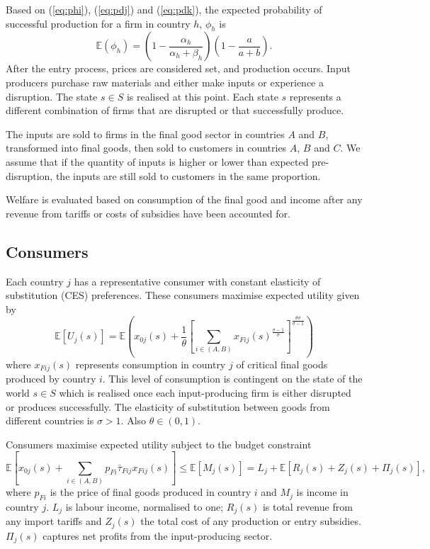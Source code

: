 \documentclass{article}
\begin{document}
Based on (\ref{eq:phi}), (\ref{eq:pdj}) and (\ref{eq:pdk}), the expected probability of successful production for a firm in country $h$, $\phi_h$ is
\begin{equation}\label{eq:ephi}
    \mathbb{E} (\phi_h) = \left(1 - \frac{\alpha_h}{\alpha_h + \beta_h}\right) \left(1 - \frac{a}{a + b}\right).
\end{equation}
After the entry process, prices are considered set, and production occurs. Input producers purchase raw materials and either make inputs or experience a disruption. The state $s \in S$ is realised at this point. Each state $s$ represents a different combination of firms that are disrupted or that successfully produce.

The inputs are sold to firms in the final good sector in countries $A$ and $B$, transformed into final goods, then sold to customers in countries $A$, $B$ and $C$. We assume that if the quantity of inputs is higher or lower than expected pre-disruption, the inputs are still sold to customers in the same proportion. 

Welfare is evaluated based on consumption of the final good and income after any revenue from tariffs or costs of subsidies have been accounted for.

\subsection{Consumers}
 
Each country $j$ has a representative consumer with constant elasticity of substitution (CES) preferences. These consumers maximise expected utility given by
\begin{equation} \label{eq:utility}
    \mathbb{E}[U_j(s)] = \mathbb{E} \left( x_{0j}(s) + \frac{1}{\theta} \left[ \sum_{i \in (A, B)} x_{Fij}(s)^{\frac{\sigma - 1}{\sigma}} \right]^{\frac{\theta \sigma}{\sigma - 1}} \right)
\end{equation}
where $x_{Fij}(s)$ represents consumption in country $j$ of critical final goods produced by country $i$. This level of consumption is contingent on the state of the world $s \in S$ which is realised once each input-producing firm is either disrupted or produces successfully. The elasticity of substitution between goods from different countries is $\sigma > 1$. Also $\theta \in (0, 1)$.

Consumers maximise expected utility subject to the budget constraint 
\begin{equation*}
    \mathbb{E} \left[ x_{0j}(s) + \sum_{i \in (A, B)} p_{Fi} \bar{\tau}_{Fij} x_{Fij}(s) \right] \leq \mathbb{E} \left[ M_j(s) \right] = L_j + \mathbb{E} \left[ R_j(s) + Z_j(s) + \Pi_j(s) \right],
\end{equation*}
where $p_{Fi}$ is the price of final goods produced in country $i$ and $M_j$ is income in country $j$. $L_j$ is labour income, normalised to one; $R_j(s)$ is total revenue from any import tariffs and $Z_j(s)$ the total cost of any production or entry subsidies. $\Pi_j(s)$ captures net profits from the input-producing sector.
\end{document}

